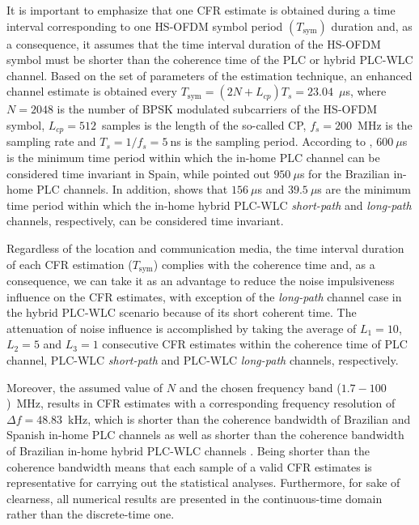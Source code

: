 It is important to emphasize that one \ac{CFR} estimate is obtained during a time interval corresponding to one \ac{HS-OFDM} symbol period $(T_{\textrm{sym}})$ duration and, as a consequence, it assumes that the time interval duration of the \ac{HS-OFDM} symbol must be shorter than the coherence time of the \ac{PLC} or hybrid \ac{PLC}-\ac{WLC} channel. Based on the set of parameters of the estimation technique, an enhanced channel estimate is obtained every $T_{\textrm{sym}}=(2N + L_{cp}) T_s = 23.04$~$\mu$s, where $N=2048$ is the number of \ac{BPSK} modulated subcarriers of the \ac{HS-OFDM} symbol, $L_{cp}=512$~samples is the length of the so-called \ac{CP}, $f_s=200$~MHz is the sampling rate and $T_s=1/f_s=5~$ns is the sampling period. According to \cite{Canete:AIPLC}, $600~\mu$s is the minimum time period within which the in-home \ac{PLC} channel can be considered time invariant in Spain, while \cite{Thiago:Characterization} pointed out $950~\mu$s for the Brazilian in-home \ac{PLC} channels. In addition, \cite{thiago:hyb} shows that  $156~\mu$s and $39.5~\mu$s are the minimum time period within which the in-home hybrid \ac{PLC}-\ac{WLC} \textit{short-path} and \textit{long-path} channels, respectively, can be considered time invariant. 

Regardless of the location and communication media, the time interval duration of each \ac{CFR} estimation ($T_{\textrm{sym}}$) complies with the coherence time and, as a consequence, we can take it as an advantage to reduce the noise impulsiveness influence on the \ac{CFR} estimates, with exception of the \textit{long-path} channel case in the hybrid \ac{PLC}-\ac{WLC} scenario because of its short coherent time. The attenuation of noise influence is accomplished by taking the average of $L_1=10$, $L_2=5$ and $L_3=1$ consecutive \ac{CFR} estimates within the coherence time of \ac{PLC} channel, \ac{PLC}-\ac{WLC} \textit{short-path} and \ac{PLC}-\ac{WLC} \textit{long-path} channels, respectively. 

Moreover, the assumed value of $N$ and the chosen frequency band ($1.7-100$)~MHz, results in \ac{CFR} estimates with a corresponding frequency resolution of $\Delta f=48.83$~kHz, which is shorter than the coherence bandwidth of Brazilian and Spanish in-home PLC channels \cite{Canete:AIPLC,Thiago:Characterization} as well as shorter than the coherence bandwidth of Brazilian in-home hybrid \ac{PLC}-\ac{WLC} channels \cite{thiago:hyb}. Being shorter than the coherence bandwidth means that each sample of a valid \ac{CFR} estimates is representative for carrying out the statistical analyses. Furthermore, for sake of clearness, all numerical results are presented in the continuous-time domain rather than the discrete-time one.

